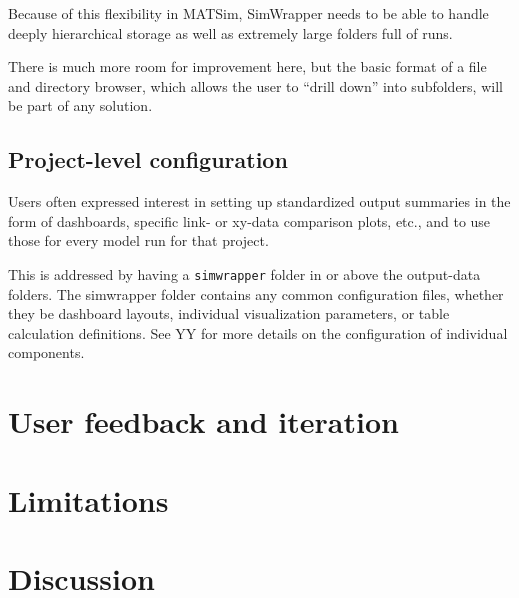 Because of this flexibility in MATSim, SimWrapper needs to be able to
handle deeply hierarchical storage as well as extremely large folders
full of runs.

There is much more room for improvement here, but the basic format of a
file and directory browser, which allows the user to ``drill down'' into
subfolders, will be part of any solution.

\hypertarget{project-level-configuration}{%
\subsection{Project-level
configuration}\label{project-level-configuration}}

Users often expressed interest in setting up standardized output
summaries in the form of dashboards, specific link- or xy-data
comparison plots, etc., and to use those for every model run for that
project.

This is addressed by having a \texttt{simwrapper} folder in or above the
output-data folders. The simwrapper folder contains any common
configuration files, whether they be dashboard layouts, individual
visualization parameters, or table calculation definitions. See YY for
more details on the configuration of individual components.

\hypertarget{user-feedback-and-iteration}{%
\section{User feedback and
iteration}\label{user-feedback-and-iteration}}

\hypertarget{limitations}{%
\section{Limitations}\label{limitations}}

\hypertarget{discussion}{%
\section{Discussion}\label{discussion}}
